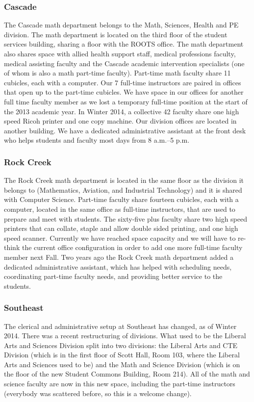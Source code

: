 \subsubsection{Cascade}
The Cascade math department belongs to the Math, Sciences, Health and PE division.
The math department is located on the third floor of the student services building, sharing a floor with the ROOTS office.
The math department also shares space with allied health support staff, medical professions faculty, medical assisting faculty and the Cascade academic intervention specialists (one of whom is also a math part-time faculty).
Part-time math faculty share 11 cubicles, each with a computer.
Our 7 full-time instructors are paired in offices that open up to the part-time cubicles.
We have space in our offices for another full time faculty member as we lost a temporary full-time position at the start of the 2013 academic year.
In Winter 2014, a collective 42 faculty share one high speed Ricoh printer and one copy machine.
Our division offices are located in another building.
We have a dedicated administrative assistant at the front desk who helps students and faculty most days from 8 {\sc a.m.--5 p.m.}

\subsubsection{Rock Creek} The Rock Creek math department is located in the same floor as the division it belongs to (Mathematics, Aviation, and Industrial Technology) and it is shared with Computer Science.
Part-time faculty share fourteen cubicles, each with a computer, located in the same office as full-time instructors, that are used to prepare and meet with students.
The sixty-five plus faculty share two high speed printers that can collate, staple and allow double sided printing, and one high speed scanner.
Currently we have reached space capacity and we will have to re-think the current office configuration in order to add one more full-time faculty member next Fall.
Two years ago the Rock Creek math department added a dedicated administrative assistant, which has helped with scheduling needs, coordinating part-time faculty needs, and providing better service to the students.

\subsubsection{Southeast}
The clerical and administrative setup at Southeast has changed, as of Winter 2014.
There was a recent restructuring of divisions.
What used to be the Liberal Arts and Sciences Division split into two divisions: the Liberal Arts and CTE Division (which is in the first floor of Scott Hall, Room 103, where the Liberal Arts and Sciences used to be) and the Math and Science Division (which is on the  floor of the new Student Commons Building, Room 214).
All of the math and science faculty are now in this new space, including the part-time instructors (everybody was scattered before, so this is a welcome change).

